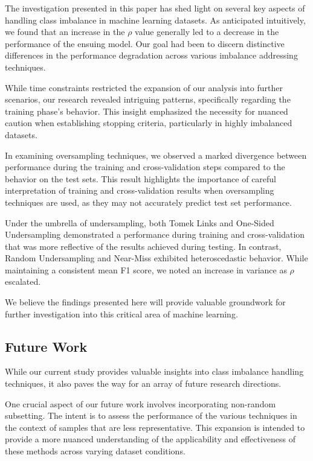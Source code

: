 \documentclass[journal]{IEEEtran}
\begin{document}
	The investigation presented in this paper has shed light on several key aspects of handling class imbalance in machine learning datasets. As anticipated intuitively, we found that an increase in the $\rho$ value generally led to a decrease in the performance of the ensuing model. Our goal had been to discern distinctive differences in the performance degradation across various imbalance addressing techniques.
	
	While time constraints restricted the expansion of our analysis into further scenarios, our research revealed intriguing patterns, specifically regarding the training phase's behavior. This insight emphasized the necessity for nuanced caution when establishing stopping criteria, particularly in highly imbalanced datasets.
	
	In examining oversampling techniques, we observed a marked divergence between performance during the training and cross-validation steps compared to the behavior on the test sets. This result highlights the importance of careful interpretation of training and cross-validation results when oversampling techniques are used, as they may not accurately predict test set performance.
	
	Under the umbrella of undersampling, both Tomek Links and One-Sided Undersampling demonstrated a performance during training and cross-validation that was more reflective of the results achieved during testing. In contrast, Random Undersampling and Near-Miss exhibited heteroscedastic behavior. While maintaining a consistent mean F1 score, we noted an increase in variance as $\rho$ escalated.
	
	We believe the findings presented here will provide valuable groundwork for further investigation into this critical area of machine learning.
	
	
	\subsection{Future Work}
	
	While our current study provides valuable insights into class imbalance handling techniques, it also paves the way for an array of future research directions.
	
	One crucial aspect of our future work involves incorporating non-random subsetting. The intent is to assess the performance of the various techniques in the context of samples that are less representative. This expansion is intended to provide a more nuanced understanding of the applicability and effectiveness of these methods across varying dataset conditions.
	
\end{document}
